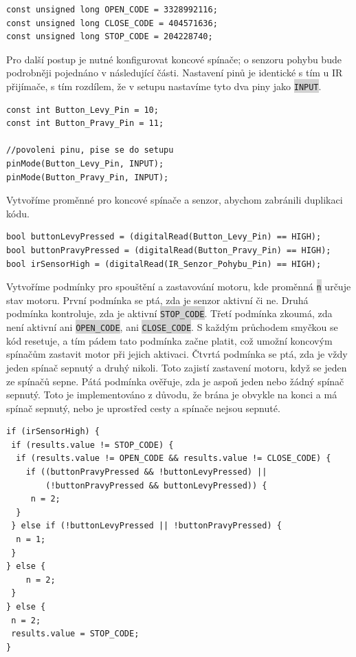 \documentclass[12pt, a4paper, twoside]{report}
\newcommand{\code}[1]{\colorbox{lightgray}{\texttt{#1}}}
\begin{document}
	\begin{lstlisting}[style=c++]
const unsigned long OPEN_CODE = 3328992116;
const unsigned long CLOSE_CODE = 404571636;
const unsigned long STOP_CODE = 204228740;
	\end{lstlisting}

	\newpage

	\noindent 
	Pro další postup je nutné konfigurovat koncové spínače; o senzoru pohybu bude podrobněji pojednáno v následující části. Nastavení pinů je identické s tím u IR přijímače, s tím rozdílem, že v setupu nastavíme tyto dva piny jako \code{INPUT}. \\
	
	\begin{lstlisting}[style=c++]
const int Button_Levy_Pin = 10;
const int Button_Pravy_Pin = 11;
		
//povoleni pinu, pise se do setupu
pinMode(Button_Levy_Pin, INPUT);
pinMode(Button_Pravy_Pin, INPUT);
	\end{lstlisting}
	
	\noindent Vytvoříme proměnné pro koncové spínače a senzor, abychom zabránili duplikaci kódu.\\
	
	\begin{lstlisting}[style=c++]
bool buttonLevyPressed = (digitalRead(Button_Levy_Pin) == HIGH);
bool buttonPravyPressed = (digitalRead(Button_Pravy_Pin) == HIGH);
bool irSensorHigh = (digitalRead(IR_Senzor_Pohybu_Pin) == HIGH);
	\end{lstlisting}

	\noindent Vytvoříme podmínky pro spouštění a zastavování motoru, kde proměnná \code{n} určuje stav motoru. První podmínka se ptá, zda je senzor aktivní či ne. Druhá podmínka kontroluje, zda je aktivní \code{STOP\_CODE}. Třetí podmínka zkoumá, zda není aktivní ani \code{OPEN\_CODE}, ani \code{CLOSE\_CODE}. S každým průchodem smyčkou se kód resetuje, a tím pádem tato podmínka začne platit, což umožní koncovým spínačům zastavit motor při jejich aktivaci. Čtvrtá podmínka se ptá, zda je vždy jeden spínač sepnutý a druhý nikoli. Toto zajistí zastavení motoru, když se jeden ze spínačů sepne. Pátá podmínka ověřuje, zda je aspoň jeden nebo žádný spínač sepnutý. Toto je implementováno z důvodu, že brána je obvykle na konci a má spínač sepnutý, nebo je uprostřed cesty a spínače nejsou sepnuté. \\
	
\begin{lstlisting}[style=c++]
if (irSensorHigh) { 
 if (results.value != STOP_CODE) { 
  if (results.value != OPEN_CODE && results.value != CLOSE_CODE) {
    if ((buttonPravyPressed && !buttonLevyPressed) || 
        (!buttonPravyPressed && buttonLevyPressed)) {
     n = 2;                         
  }
 } else if (!buttonLevyPressed || !buttonPravyPressed) { 
  n = 1;
 }
} else {
	n = 2;
 }
} else {
 n = 2;
 results.value = STOP_CODE;
}
\end{lstlisting}
	
\end{document}
